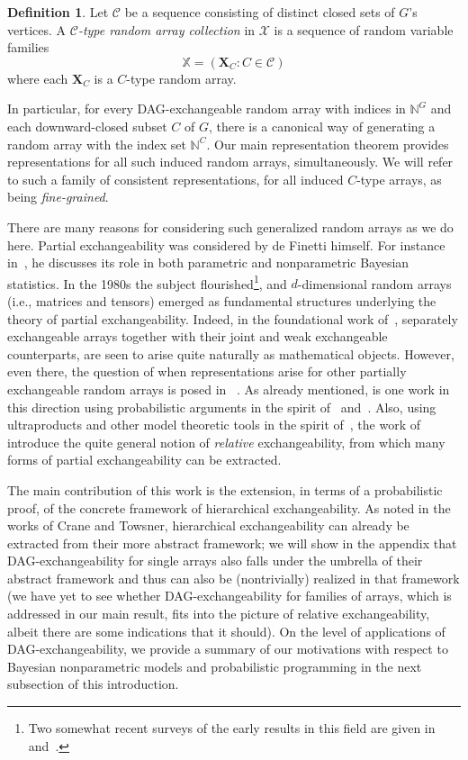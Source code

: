 \documentclass[10pt]{amsart}
\theoremstyle{definition}\newtheorem{defi}[theo]{Definition}\newtheorem{rema}[theo]{Remark}\newtheorem{exam}[theo]{Example}\newtheorem{exem}[theo]{Example}\newtheorem{nota}[theo]{Notation}
\newcommand*\CC{{\mathcal{C}}}
\newcommand*\XX{{\mathcal{X}}}
\newcommand*\bX{\mathbf{X}}
\begin{document}
\begin{defi}\label{def:fg-randomarray}
Let $\CC$ be a sequence consisting of distinct closed sets of $G$'s vertices. A \emph{$\CC$-type random array collection} in $\XX$ is a sequence of random variable families
\[
\mathbb{X}= (\bX_C : C \in \CC)
\]
where each $\bX_C$ is a $C$-type random array.
\end{defi}

In particular, for every DAG-exchangeable random array with indices in $\mathbb{N}^G$ and each downward-closed subset $C$ of $G$, there is a canonical way of generating a random array with the index set $\mathbb{N}^C$. Our main representation theorem provides representations for all such induced random arrays, simultaneously. We will refer to such a family of consistent representations, for all induced $C$-type arrays, as being \emph{fine-grained}.


There are many reasons for considering such generalized random arrays as we do here. Partial exchangeability was considered by de Finetti himself. For instance in~\cite[Chapter~12]{de1975theory}, he discusses its role in both parametric and nonparametric Bayesian statistics. In the 1980s the subject flourished\footnote{Two somewhat recent surveys of the early results in this field are given in~\cite{austin2012exchangeable} and~\cite{aldous2009more}.}, and $d$-dimensional random arrays (i.e., matrices and tensors) emerged as fundamental structures underlying the theory of partial exchangeability. Indeed, in the foundational work of~\cite{hoover1979relations}, separately exchangeable arrays together with their joint and weak exchangeable counterparts, are seen to arise quite naturally as mathematical objects. However, even there, the question of when representations arise for other partially exchangeable random arrays is posed in~\cite[Section~7]{hoover1979relations} . As already mentioned, \cite{austin:panchenko:2014} is one work in this direction using probabilistic arguments in the spirit of~\cite{aldous1981representations} and~\cite{kallenberg2006probabilistic}. Also, using ultraproducts and other model theoretic tools in the spirit of~\cite{hoover1979relations}, the work of~\cite{crane2017relative, crane2018relatively} introduce the quite general notion of \emph{relative} exchangeability, from which many forms of partial exchangeability can be extracted.

The main contribution of this work is the extension, in terms of a probabilistic proof, of the concrete framework of hierarchical exchangeability. As noted in the works of Crane and Towsner, hierarchical exchangeability can already be extracted from their more abstract framework; we will show in the appendix that DAG-exchangeability for single arrays also falls under the umbrella of their abstract framework and thus can also be (nontrivially) realized in that framework (we have yet to see whether DAG-exchangeability for families of arrays, which is addressed in our main result, fits into the picture of relative exchangeability, albeit there are some indications that it should). On the level of applications of DAG-exchangeability, we provide a summary of our motivations with respect to Bayesian nonparametric models and probabilistic programming in the next subsection of this introduction.
\end{document}
